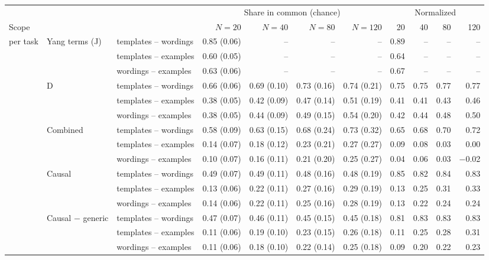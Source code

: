 \begin{tabular}{@{}lllrrrrrrrr@{}}
\toprule
& & & \multicolumn{4}{c}{Share in common (chance)} & \multicolumn{4}{c}{Normalized} \\
\cmidrule(lr){4-7} \cmidrule(lr){8-11}
Scope & & & $N=20$ & $N=40$ & $N=80$ & $N=120$ & 20 & 40 & 80 & 120 \\
\midrule
per task & Yang terms (J) & templates -- wordings & 0.85 (0.06) & -- & -- & -- & 0.89 & -- & -- & -- \\
 &  & templates -- examples & 0.60 (0.05) & -- & -- & -- & 0.64 & -- & -- & -- \\
 &  & wordings -- examples & 0.63 (0.06) & -- & -- & -- & 0.67 & -- & -- & -- \\
\addlinespace
 & D & templates -- wordings & 0.66 (0.06) & 0.69 (0.10) & 0.73 (0.16) & 0.74 (0.21) & 0.75 & 0.75 & 0.77 & 0.77 \\
 &  & templates -- examples & 0.38 (0.05) & 0.42 (0.09) & 0.47 (0.14) & 0.51 (0.19) & 0.41 & 0.41 & 0.43 & 0.46 \\
 &  & wordings -- examples & 0.38 (0.05) & 0.44 (0.09) & 0.49 (0.15) & 0.54 (0.20) & 0.42 & 0.44 & 0.48 & 0.50 \\
\addlinespace
 & Combined & templates -- wordings & 0.58 (0.09) & 0.63 (0.15) & 0.68 (0.24) & 0.73 (0.32) & 0.65 & 0.68 & 0.70 & 0.72 \\
 &  & templates -- examples & 0.14 (0.07) & 0.18 (0.12) & 0.23 (0.21) & 0.27 (0.27) & 0.09 & 0.08 & 0.03 & 0.00 \\
 &  & wordings -- examples & 0.10 (0.07) & 0.16 (0.11) & 0.21 (0.20) & 0.25 (0.27) & 0.04 & 0.06 & 0.03 & $-$0.02 \\
\addlinespace
 & Causal & templates -- wordings & 0.49 (0.07) & 0.49 (0.11) & 0.48 (0.16) & 0.48 (0.19) & 0.85 & 0.82 & 0.84 & 0.83 \\
 &  & templates -- examples & 0.13 (0.06) & 0.22 (0.11) & 0.27 (0.16) & 0.29 (0.19) & 0.13 & 0.25 & 0.31 & 0.33 \\
 &  & wordings -- examples & 0.14 (0.06) & 0.22 (0.11) & 0.25 (0.16) & 0.28 (0.19) & 0.13 & 0.22 & 0.24 & 0.24 \\
\addlinespace
 & Causal $-$ generic & templates -- wordings & 0.47 (0.07) & 0.46 (0.11) & 0.45 (0.15) & 0.45 (0.18) & 0.81 & 0.83 & 0.83 & 0.83 \\
 &  & templates -- examples & 0.11 (0.06) & 0.19 (0.10) & 0.23 (0.15) & 0.26 (0.18) & 0.11 & 0.25 & 0.28 & 0.31 \\
 &  & wordings -- examples & 0.11 (0.06) & 0.18 (0.10) & 0.22 (0.14) & 0.25 (0.18) & 0.09 & 0.20 & 0.22 & 0.23 \\

\end{tabular}

